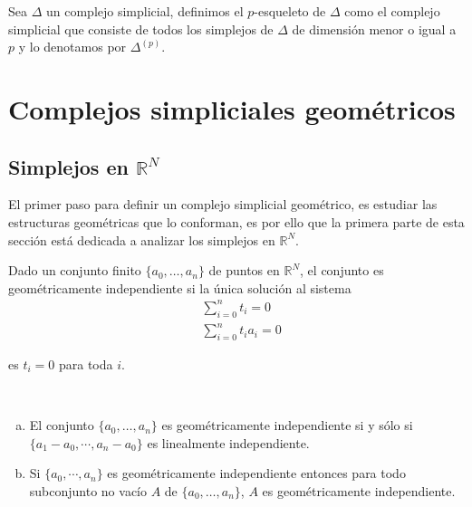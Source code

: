 \begin{Defi}
Sea $\Delta$ un complejo simplicial, definimos el $p$-esqueleto de $\Delta$ como el complejo simplicial que consiste de todos los simplejos de $\Delta$ de dimensión menor o igual a $p$ y lo denotamos por $\Delta^(p)$.
\end{Defi}

\section{Complejos simpliciales geométricos}
\subsection{Simplejos en $\mathbb{R}^N$}  
El primer paso para definir un complejo simplicial geométrico, es estudiar las estructuras geométricas que lo conforman, es por ello que la primera parte de esta sección está dedicada a analizar los simplejos en $\mathbb{R}^N$.           
\begin{Defi}
Dado un conjunto finito $\{a_0,\ldots,a_n\}$ de puntos en $\mathbb{R}^{N}$, el conjunto es geométricamente independiente si la única solución al sistema 
\begin{equation}\label{s1}
    \begin{split}
     &\sum_{i=0}^{n}t_{i} = 0 \\
     &\sum_{i=0}^{n}t_{i}a_{i} = 0   
    \end{split}
\end{equation}

es $t_i = 0$ para toda $i$.
\end{Defi}

\begin{Teo}
~\begin{enumerate}[(a)]
    \item El conjunto $\{a_0,\ldots,a_n\}$ es geométricamente independiente si y sólo si $\{a_1-a_0,\cdots,a_n-a_0\}$ es linealmente independiente.
    \item Si $\{a_0,\cdots,a_n\}$ es geométricamente independiente entonces para todo subconjunto no vacío $A$ de $\{a_0,\ldots,a_n\}$, $A$ es geométricamente independiente.
\end{enumerate}
\end{Teo}

